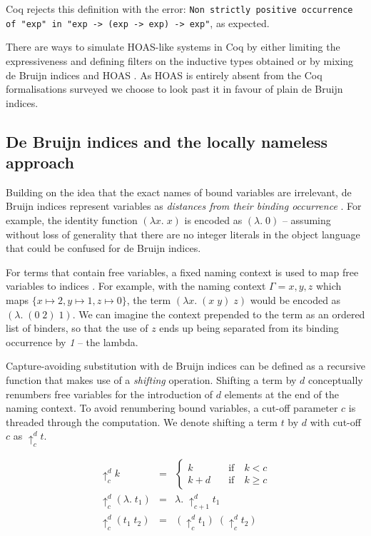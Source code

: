 \documentclass[]{unswthesis}
\let\c\texttt
\let\i\textit
\begin{document}
Coq rejects this definition with the error: \c{Non strictly positive occurrence of "exp" in
 "exp -> (exp -> exp) -> exp"}, as expected.

There are ways to simulate HOAS-like systems in Coq by either limiting the expressiveness and defining filters on the inductive types obtained \cite{despeyroux95} or by mixing de Bruijn indices and HOAS \cite{capretta07}. As HOAS is entirely absent from the Coq formalisations surveyed we choose to look past it in favour of plain de Bruijn indices.

\subsection{De Bruijn indices and the locally nameless approach}
\label{sec:de_bruijn}

Building on the idea that the exact names of bound variables are irrelevant, de Bruijn indices represent variables as \i{distances from their binding occurrence} \cite{deBruijn72}. For example, the identity function $(\lambda x. \; x)$ is encoded as $(\lambda . \; 0)$ -- assuming without loss of generality that there are no integer literals in the object language that could be confused for de Bruijn indices.

For terms that contain free variables, a fixed naming context is used to map free variables to indices \cite{tapl}. For example, with the naming context $\Gamma = x, y, z$ which maps $\{x \mapsto 2, y \mapsto 1, z \mapsto 0\}$, the term $(\lambda x. \; (x \; y) \; z)$ would be encoded as $(\lambda. \; (0 \; 2) \; 1)$. We can imagine the context prepended to the term as an ordered list of binders, so that the use of $z$ ends up being separated from its binding occurrence by \i{1} -- the lambda.

Capture-avoiding substitution with de Bruijn indices can be defined as a recursive function that makes use of a \i{shifting} operation. Shifting a term by $d$ conceptually renumbers free variables for the introduction of $d$ elements at the end of the naming context. To avoid renumbering bound variables, a cut-off parameter $c$ is threaded through the computation. We denote shifting a term $t$ by $d$ with cut-off $c$ as $\uparrow^d_c t$.

\begin{eqnarray*}
\uparrow^d_c k & = &
	\begin{cases}
	k \quad & \text{if} \quad k < c \\
	k + d \quad & \text{if} \quad k \geq c
	\end{cases}\\
\uparrow^d_c (\lambda. \; t_1) & = & \lambda. \; \uparrow^d_{c + 1} t_1\\
\uparrow^d_c (t_1 \; t_2) & = & (\uparrow^d_c t_1) \; (\uparrow^d_c t_2)
\end{eqnarray*}
\end{document}
